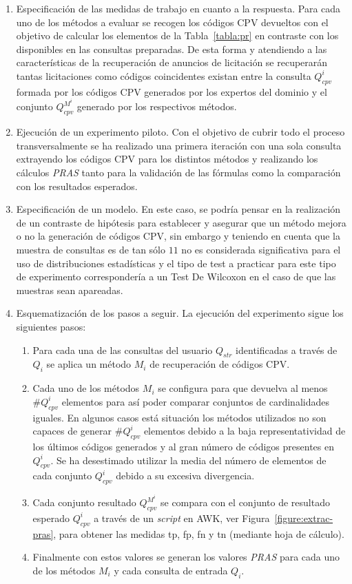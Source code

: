 \begin{enumerate}
 \item Especificación de las medidas de trabajo en cuanto a la respuesta. Para cada uno de los métodos a evaluar se recogen los códigos 
CPV devueltos con el objetivo de calcular los elementos de la Tabla~\ref{tabla:pr} en contraste con los disponibles en las 
consultas preparadas. De esta forma y atendiendo a las características de la recuperación de anuncios de licitación se 
recuperarán tantas licitaciones como códigos coincidentes existan entre la consulta $Q^{i}_{cpv}$ formada por los códigos 
CPV generados por los expertos del dominio y el conjunto $Q^{M^i}_{cpv}$ generado por los respectivos métodos.

 \item Ejecución de un experimento piloto. Con el objetivo de cubrir todo el proceso transversalmente se ha realizado una primera iteración 
con una sola consulta extrayendo los códigos CPV para los distintos métodos y realizando los cálculos \textit{PRAS} tanto para 
la validación de las fórmulas como la comparación con los resultados esperados.

 \item Especificación de un modelo. En este caso, se podría pensar en la realización de un contraste de hipótesis para establecer 
y asegurar que un método mejora o no la generación de códigos CPV, sin embargo y teniendo en cuenta que la muestra de consultas 
es de tan sólo $11$ no es considerada significativa para el uso de distribuciones estadísticas y el tipo de test a practicar 
para este tipo de experimento correspondería a un Test De Wilcoxon en el caso de que las muestras sean apareadas.
 \item Esquematización de los pasos a seguir. La ejecución del experimento sigue los siguientes pasos:
\begin{enumerate}
 \item Para cada una de las consultas del usuario $Q_{str}$ identificadas a través de $Q_{i}$ se aplica 
un método $M_{i}$ de recuperación de códigos CPV.
\item Cada uno de los métodos $M_{i}$ se configura para que devuelva al menos $\#Q^{i}_{cpv}$ elementos para así poder 
comparar conjuntos de cardinalidades iguales. En algunos casos está situación los métodos utilizados no son capaces 
de generar $\#Q^{i}_{cpv}$ elementos debido a la baja representatividad de los últimos códigos generados y al gran número de 
códigos presentes en $Q^{i}_{cpv}$. Se ha desestimado utilizar la media del número de elementos de cada 
conjunto $Q^{i}_{cpv}$ debido a su excesiva divergencia.
\item Cada conjunto resultado $Q^{M^i}_{cpv}$ se compara con el conjunto de resultado esperado $Q^{i}_{cpv}$ a través de un \textit{script} en 
AWK, ver Figura~\ref{figure:extrac-pras}, para obtener las medidas tp, fp, fn y tn (mediante hoja de cálculo).
\item Finalmente con estos valores se generan los valores \textit{PRAS} para cada uno de los métodos $M_{i}$ y cada 
consulta de entrada $Q_{i}$.


\end{enumerate}
\end{enumerate}
